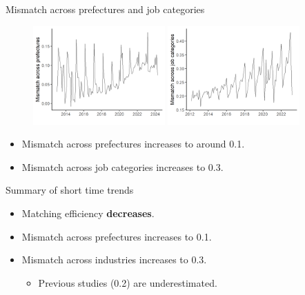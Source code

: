 \documentclass[aspectratio=169]{beamer}
\begin{document}
\begin{frame}{Mismatch across prefectures and job categories}
\begin{figure}[!ht]
  \begin{center}

  \includegraphics[width = 0.45\textwidth]
  {figuretable/mismatch_part_and_full_time_monthly_prefecture.png}
  \includegraphics[width = 0.45\textwidth]
  {figuretable/mismatch_part_and_full_time_monthly_job_category.png}
  \end{center}
  \footnotesize
\end{figure} 
\begin{itemize}
    \item Mismatch across prefectures increases to around 0.1.
    \item Mismatch across job categories increases to 0.3.
\end{itemize}

\end{frame}


\begin{frame}{Summary of short time trends}
    \begin{itemize}
        \item Matching efficiency \textbf{decreases}.
        \item Mismatch across prefectures increases to 0.1.
        \item Mismatch across industries increases to 0.3.
        \begin{itemize}
            \item Previous studies (0.2) are underestimated.
        \end{itemize}
    \end{itemize}
\end{frame}
\end{document}
